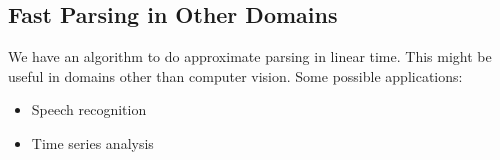 \subsection{Fast Parsing in Other Domains}

We have an algorithm to do approximate parsing in linear time. This
might be useful in domains other than computer vision. Some possible
applications:
\begin{itemize}
\item Speech recognition
\item Time series analysis
\end{itemize}
